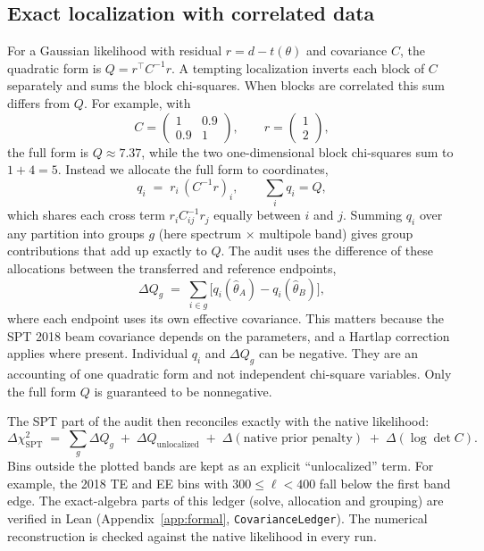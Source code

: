 \documentclass[11pt]{article}
\theoremstyle{remark}
\newcommand{\dchi}{\Delta \chi^2}
\numberwithin{equation}{section}
\begin{document}
\subsection{Exact localization with correlated data}
\label{sec:ledger}

For a Gaussian likelihood with residual $r=d-t(\theta)$ and covariance $C$, the quadratic form is $Q=r^\top C^{-1}r$. A tempting localization inverts each block of $C$ separately and sums the block chi-squares. When blocks are correlated this sum differs from $Q$. For example, with
\[
  C=\begin{pmatrix}1&0.9\\0.9&1\end{pmatrix},\qquad r=\begin{pmatrix}1\\2\end{pmatrix},
\]
the full form is $Q\approx7.37$, while the two one-dimensional block chi-squares sum to $1+4=5$. Instead we allocate the full form to coordinates,
\begin{equation}
  q_i \;=\; r_i\,(C^{-1}r)_i, \qquad \sum_i q_i = Q,
  \label{eq:signed_alloc}
\end{equation}
which shares each cross term $r_iC^{-1}_{ij}r_j$ equally between $i$ and $j$. Summing $q_i$ over any partition into groups $g$ (here spectrum $\times$ multipole band) gives group contributions that add up exactly to $Q$. The audit uses the difference of these allocations between the transferred and reference endpoints,
\begin{equation}
  \Delta Q_g \;=\; \sum_{i\in g}\bigl[q_i(\hat\theta_A)-q_i(\hat\theta_B)\bigr],
  \label{eq:block_dchi}
\end{equation}
where each endpoint uses its own effective covariance. This matters because the SPT 2018 beam covariance depends on the parameters, and a Hartlap correction applies where present. Individual $q_i$ and $\Delta Q_g$ can be negative. They are an accounting of one quadratic form and not independent chi-square variables. Only the full form $Q$ is guaranteed to be nonnegative.

The SPT part of the audit then reconciles exactly with the native likelihood:
\begin{equation}
  \dchi_{\mathrm{SPT}} \;=\; \sum_g\Delta Q_g \;+\; \Delta Q_{\mathrm{unlocalized}} \;+\; \Delta(\text{native prior penalty}) \;+\; \Delta(\log\det C).
  \label{eq:ledger}
\end{equation}
Bins outside the plotted bands are kept as an explicit ``unlocalized'' term. For example, the 2018 TE and EE bins with $300\le\ell<400$ fall below the first band edge. The exact-algebra parts of this ledger (solve, allocation and grouping) are verified in Lean (Appendix~\ref{app:formal}, \texttt{CovarianceLedger}). The numerical reconstruction is checked against the native likelihood in every run.
\end{document}
